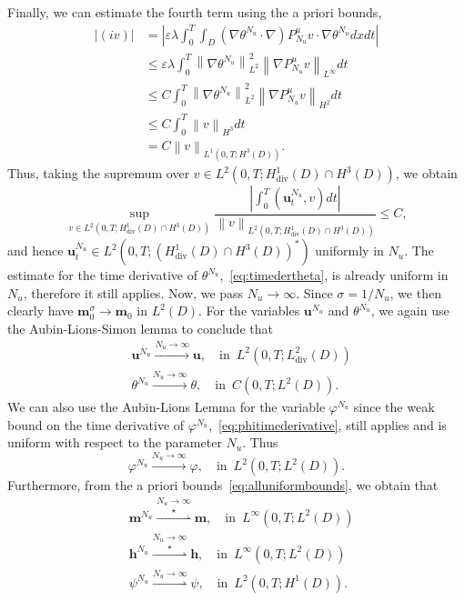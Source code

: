 \documentclass[10pt,letterpaper,twoside]{amsart}
\theoremstyle{definition}{\newtheorem{definition}[lemma]{Definition}}
\theoremstyle{note}{\newtheorem{claim}{Claim}[section]
\newtheorem*{claim*}{Claim}}
\numberwithin{equation}{section}
\newcommand{\dom}{D}
\newcommand{\norm}[1]{\left\| #1 \right\|}
\newcommand{\weakstar}{\overset{\star}\rightharpoonup}
\newcommand{\Grad}{\nabla}
\newcommand{\Div}{\operatorname{div}}
\newcommand{\weak}{\rightharpoonup}
\newcommand{\V}{H^1_{\Div}(\dom)}
\newcommand{\bu}{\mathbf{u}}
\newcommand{\bm}{\mathbf{m}}
\newcommand{\buc}{\mathbf{u}^{N_u}}
\newcommand{\thc}{\theta^{N_u}}
\newcommand{\bh}{\mathbf{h}}
\begin{document}
 Finally, we can estimate the fourth term using the a priori bounds,
 \begin{align*}
 	|(iv)|& = \left|\varepsilon\lambda\int_0^T\int_{\dom} (\Grad\thc\cdot\Grad) P_{N_u}^u v \cdot \Grad\thc dx dt\right|\\
 	&\leq \varepsilon\lambda \int_0^T \norm{\Grad\thc}_{L^2}^2\norm{\Grad P^u_{N_u}v}_{L^\infty} dt\\
 	&\leq C\int_0^T \norm{\Grad\thc}_{L^2}^2\norm{\Grad P^u_{N_u}v}_{H^2} dt\\
 		&\leq C\int_0^T \norm{v}_{H^3} dt\\
 	& = C \norm{v}_{L^1(0,T;H^3(\dom))}.
 \end{align*}
 Thus, taking the supremum over $v\in L^2(0,T;\V\cap H^3(\dom))$, we obtain
 \begin{equation}\label{eq:utimecont}
 	\sup_{v\in L^2(0,T;\V\cap H^3(\dom))}\frac{ \left| \int_0^T (\buc_t,v) dt \right|}{\norm{v}_{L^2(0,T;\V\cap H^3(\dom))}} \leq C,
 \end{equation}
 and hence $\buc_t\in L^{2}(0,T;(\V\cap H^3(\dom))^*)$ uniformly in $N_u$.  The estimate for the time derivative of $\thc$,~\eqref{eq:timedertheta}, is already uniform in $N_u$, therefore it still applies. Now, we pass $N_u\to\infty$. Since $\sigma = 1/N_u$, we then clearly have $\bm_0^{\sigma}\to \bm_0$ in $L^2(\dom)$. For the variables $\bu^{N_u}$ and $\theta^{N_u}$, we again use the Aubin-Lions-Simon lemma to conclude that 
 \begin{align*}
 	&\bu^{N_u}\stackrel{N_u\to\infty}{\longrightarrow} \bu,\quad \text{in }\, L^2(0,T;L^2_{\text{div}}(\dom))\\
 	& \theta^{N_u}\stackrel{N_u\to\infty}{\longrightarrow} \theta,\quad \text{in }\, C(0,T;L^2(\dom)).
 \end{align*}
 We can also use the Aubin-Lions Lemma for the variable $\varphi^{N_u}$ since the weak bound on the time derivative  of $\varphi^{N_u}$,~\eqref{eq:phitimederivative}, still applies and is uniform with respect to the parameter $N_u$. Thus
 \begin{equation}
 	\label{eq:varphiconv}
 	\varphi^{N_u}\stackrel{N_u\to\infty}{\longrightarrow} \varphi,\quad \text{in }\, L^2(0,T;L^2(\dom)).
 \end{equation}
 Furthermore, from the a priori bounds~\eqref{eq:alluniformbounds}, we obtain that 
 \begin{align*}
 	&\bm^{N_u}\stackrel{N_u\to\infty}{\weakstar} \bm,\quad \text{in }\, L^\infty(0,T;L^2(\dom))\\
 	& \bh^{N_u}\stackrel{N_u\to\infty}{\weakstar} \bh,\quad \text{in }\, L^\infty(0,T;L^2(\dom))\\
 	& \psi^{N_u}\stackrel{N_u\to\infty}{\weak} \psi,\quad \text{in }\, L^2(0,T;H^1(\dom)).
 \end{align*}
\end{document}
